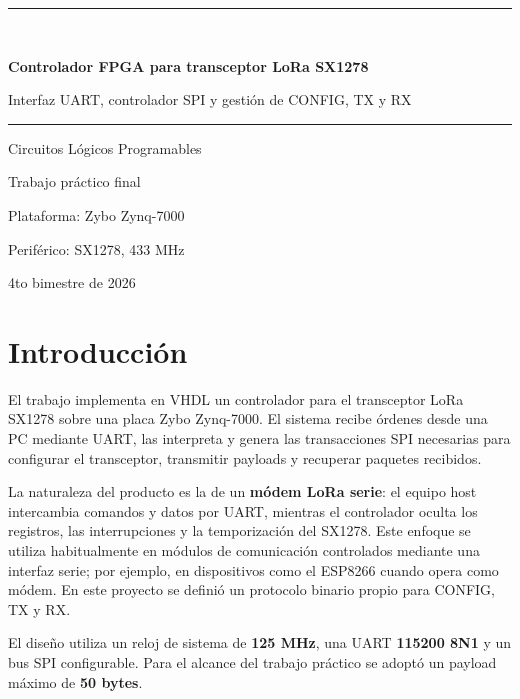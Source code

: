 \documentclass[11pt,a4paper]{article}
\begin{document}
\begin{titlepage}
    \centering
    \vspace*{18mm}
    {\color{fpgaBlue}\rule{\textwidth}{1.4pt}}\\[13mm]
    {\Huge\bfseries Controlador FPGA para transceptor LoRa SX1278\par}
    \vspace{5mm}
    {\Large Interfaz UART, controlador SPI y gestión de CONFIG, TX y RX\par}
    \vspace{13mm}
    {\color{fpgaBlue}\rule{\textwidth}{1.4pt}}

    \vfill
    {\Large Circuitos Lógicos Programables\par}
    \vspace{4mm}
    {\large Trabajo práctico final\par}
    \vspace{16mm}
    {\large Plataforma: Zybo Zynq-7000\par}
    {\large Periférico: SX1278, 433 MHz\par}
    \vfill
    {\large 4to bimestre de 2026\par}
\end{titlepage}

\tableofcontents
\clearpage
{}

\section{Introducción}

El trabajo implementa en VHDL un controlador para el transceptor LoRa SX1278
sobre una placa Zybo Zynq-7000. El sistema recibe órdenes desde una PC mediante
UART, las interpreta y genera las transacciones SPI necesarias para configurar
el transceptor, transmitir payloads y recuperar paquetes recibidos.

La naturaleza del producto es la de un \textbf{módem LoRa serie}: el equipo
host intercambia comandos y datos por UART, mientras el controlador oculta los
registros, las interrupciones y la temporización del SX1278. Este enfoque se
utiliza habitualmente en módulos de comunicación controlados mediante una
interfaz serie; por ejemplo, en dispositivos como el ESP8266 cuando opera como
módem. En este proyecto se definió un protocolo binario propio para CONFIG, TX
y RX.

El diseño utiliza un reloj de sistema de \textbf{125 MHz}, una UART
\textbf{115200 8N1} y un bus SPI configurable. Para el alcance del trabajo
práctico se adoptó un payload máximo de \textbf{50 bytes}.
\end{document}
